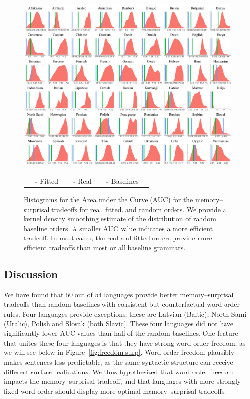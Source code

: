 \begin{figure}
	\begin{center}
\includegraphics[width=\textwidth]{auc-table_MLE.pdf}
\end{center}

\begin{center}
\begin{tabular}{llll}
\textbf{\textcolor{fitted}{----}} Fitted&
\textbf{\textcolor{real}{----}} Real&
\textbf{\textcolor{baseline}{----}} Baselines&
\end{tabular}
\end{center}
\caption{Histograms for the Area under the Curve (AUC) for the memory--surprisal tradeoffs for real, fitted, and random orders.
We provide a kernel density smoothing estimate of the distribution of random baseline orders.
A smaller AUC value indicates a more efficient tradeoff.
In most cases, the real and fitted orders provide more efficient tradeoffs than most or all baseline grammars.
}\label{fig:auc}
\end{figure}




\subsection{Discussion}\label{subsec:expt2-discussion}

We have found that 50 out of 54 languages provide better memory--surprisal tradeoffs than random baselines with consistent but counterfactual word order rules.
Four languages provide exceptions; these are Latvian (Baltic), North Sami (Uralic), Polish and Slovak (both Slavic). These four languages did not have significantly lower AUC values than half of the random baselines.
One feature that unites these four languages is that they have strong word order freedom, as we will see below in Figure~\ref{fig:freedom-surp}. %
Word order freedom plausibly makes sentences less predictable, as the same syntactic structure can receive different surface realizations.
We thus hypothesized that word order freedom  impacts the memory--surprisal tradeoff, and that languages with more strongly fixed word order should display more optimal memory--surprisal tradeoffs.


